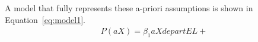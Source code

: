 A model that fully represents these a-priori assumptions is shown in Equation~\ref{eq:model1}.
\begin{align}
    P(aX) = \beta_1 aXdepartEL + 
\end{align}
